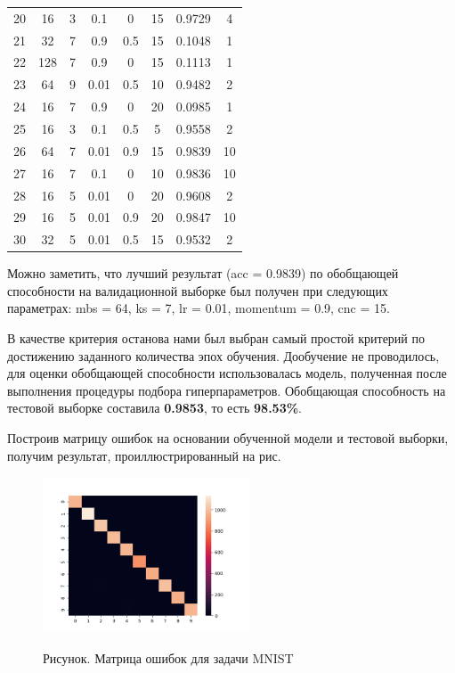 \begin{textitemize}
\begin{table}[ht]
\begin{tabular}{c c c c c c c c}
		20       & 16  & 3  & 0.1   & 0        & 15  & 0.9729 & 4  \\
		21       & 32  & 7  & 0.9   & 0.5      & 15  & 0.1048 & 1  \\
		22       & 128 & 7  & 0.9   & 0        & 15  & 0.1113 & 1  \\
		23       & 64  & 9  & 0.01  & 0.5      & 10  & 0.9482 & 2  \\
		24       & 16  & 7  & 0.9   & 0        & 20  & 0.0985 & 1  \\
		25       & 16  & 3  & 0.1   & 0.5      & 5   & 0.9558 & 2  \\
		26       & 64  & 7  & 0.01  & 0.9      & 15  & 0.9839 & 10 \\
		27       & 16  & 7  & 0.1   & 0        & 10  & 0.9836 & 10 \\
		28       & 16  & 5  & 0.01  & 0        & 20  & 0.9608 & 2  \\
		29       & 16  & 5  & 0.01  & 0.9      & 20  & 0.9847 & 10 \\
		30       & 32  & 5  & 0.01  & 0.5      & 15  & 0.9532 & 2  \\
		\hline
	\end{tabular}
	\label{table:nonlin}
\end{table}

Можно заметить, что лучший результат (acc = 0.9839) по обобщающей способности на валидационной выборке был получен при следующих параметрах: mbs = 64, ks = 7, lr = 0.01, momentum = 0.9, cnc = 15.

\item В качестве критерия останова нами был выбран самый простой критерий по достижению заданного количества эпох обучения. Дообучение не проводилось, для оценки обобщающей способности использовалась модель, полученная после выполнения процедуры подбора гиперпараметров. Обобщающая способность на тестовой выборке составила \textbf{0.9853}, то есть \textbf{98.53\%}.

\item Построив матрицу ошибок на основании обученной модели и тестовой выборки, получим результат, проиллюстрированный на рис. 

\begin{figure}[H]
	\caption{Рисунок. Матрица ошибок для задачи MNIST}
	\includegraphics[width=0.55\textwidth]{author/part3/figures/conf_matrix_result.png}
	\label{fig:conf_matrix_result}
\end{figure}


\end{textitemize}
